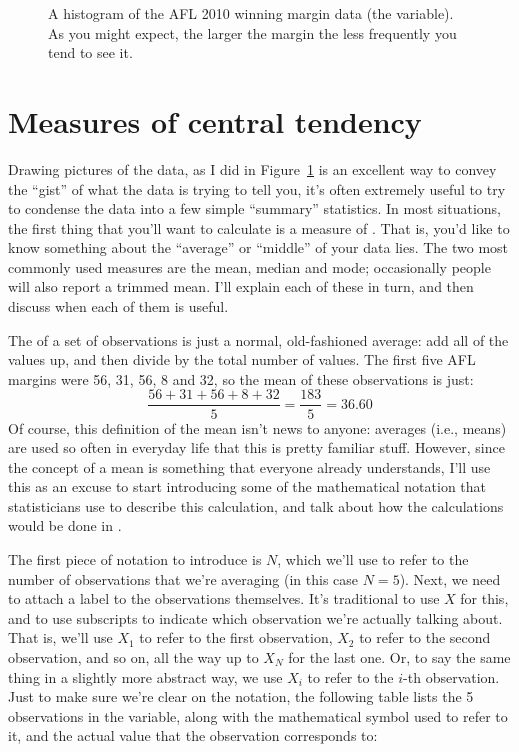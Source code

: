 \vspace*{1cm}
\begin{figure}[ht]
\begin{center}
\caption{A histogram of the AFL 2010 winning margin data (the  variable). As you might expect, the larger the margin the less frequently you tend to see it.}
\label{fig:histogram1}
\HR
\end{center}
\end{figure}

\section{Measures of central tendency~\label{sec:centraltendency}}

Drawing pictures of the data, as I did in Figure~\ref{fig:histogram1} is an excellent way to convey the ``gist'' of what the data is trying to tell you, it's often extremely useful to try to condense the data into a few simple ``summary'' statistics. In most situations, the first thing that you'll want to calculate is a measure of . That is, you'd like to know something about the ``average'' or ``middle'' of your data lies. The two most commonly used measures are the mean, median and mode; occasionally people will also report a trimmed mean. I'll explain each of these in turn, and then discuss when each of them is useful.


The  of a set of observations is just a normal, old-fashioned average: add all of the values up, and then divide by the total number of values. The first five AFL margins were 56, 31, 56, 8 and 32, so the mean of these observations is just:
$$
\frac{56 + 31 + 56 + 8 + 32}{5} = \frac{183}{5} = 36.60
$$
Of course, this definition of the mean isn't news to anyone: averages (i.e., means) are used so often in everyday life that this is pretty familiar stuff. However, since the concept of a mean is something that everyone already understands, I'll use this as an excuse to start introducing some of the mathematical notation that statisticians use to describe this calculation, and talk about how the calculations would be done in \R. 

The first piece of notation to introduce is $N$, which we'll use to refer to the number of observations that we're averaging (in this case $N = 5$). Next, we need to attach a label to the observations themselves. It's traditional to use $X$ for this, and to use subscripts to indicate which observation we're actually talking about. That is, we'll use $X_1$ to refer to the first observation, $X_2$ to refer to the second observation, and so on, all the way up to $X_N$ for the last one. Or, to say the same thing in a slightly more abstract way, we use $X_i$ to refer to the $i$-th observation. Just to make sure we're clear on the notation, the following table lists the 5 observations in the  variable, along with the mathematical symbol used to refer to it, and the actual value that the observation corresponds to:

